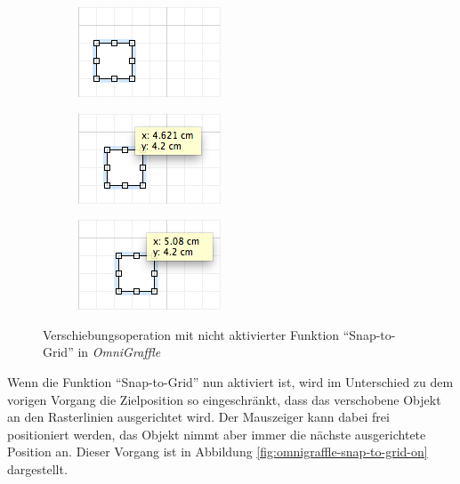 \begin{figure}[hbt]
    \newcommand{\subfigurewidth}{0.33\textwidth}
    \newcommand{\graphicswidth}{0.95\linewidth}
    \begin{subfigure}{\subfigurewidth}
        \centering
        \includegraphics[width=\graphicswidth]{resources/omnigraffle-snap-to-grid-off-a}
        \caption{}
    \end{subfigure}
    \begin{subfigure}{\subfigurewidth}
        \centering
        \includegraphics[width=\graphicswidth]{resources/omnigraffle-snap-to-grid-off-b}
        \caption{}
    \end{subfigure}
    \begin{subfigure}{\subfigurewidth}
        \centering
        \includegraphics[width=\graphicswidth]{resources/omnigraffle-snap-to-grid-off-c}
        \caption{}
    \end{subfigure}
    \caption{Verschiebungsoperation mit nicht aktivierter Funktion \enquote{Snap-to-Grid} in \textit{OmniGraffle}}
    \label{fig:omnigraffle-snap-to-grid-off}
\end{figure}

Wenn die Funktion \enquote{Snap-to-Grid} nun aktiviert ist, wird im Unterschied zu dem vorigen Vorgang die Zielposition so eingeschränkt, dass das verschobene Objekt an den Rasterlinien ausgerichtet wird. Der Mauszeiger kann dabei frei positioniert werden, das Objekt nimmt aber immer die nächste ausgerichtete Position an. Dieser Vorgang ist in Abbildung \ref{fig:omnigraffle-snap-to-grid-on} dargestellt.

